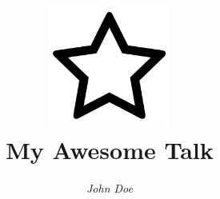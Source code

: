 \title{\includegraphics[width=0.3\textwidth]{src/graphics/logo.png}
  \vspace{-.5em}
  \\
  My Awesome Talk}
\subtitle{}
\author{\textit{John Doe}}
\date{} %
\newcommand{\twitterhandle}{twitter-handle}
